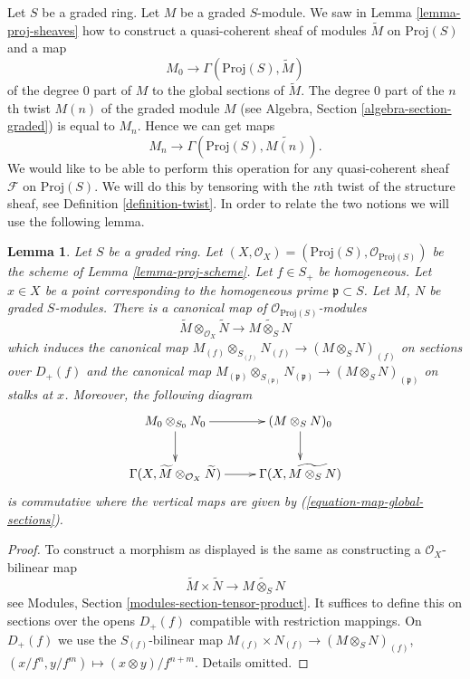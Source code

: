 \documentclass{stacks-project}
\theoremstyle{plain}
\newtheorem{lemma}[subsection]{Lemma}
\theoremstyle{definition}
\theoremstyle{remark}
\numberwithin{equation}{subsection}
\begin{document}
\noindent
Let $S$ be a graded ring. Let $M$ be a graded $S$-module.
We saw in Lemma \ref{lemma-proj-sheaves} how to construct a quasi-coherent
sheaf of modules $\widetilde{M}$ on $\text{Proj}(S)$ and a map
\begin{equation}
\label{equation-map-global-sections}
M_0 \longrightarrow \Gamma(\text{Proj}(S), \widetilde{M})
\end{equation}
of the degree $0$ part of $M$ to the global sections of $\widetilde{M}$.
The degree $0$ part of the $n$th twist $M(n)$ of the graded module $M$ (see
Algebra, Section \ref{algebra-section-graded})
is equal to $M_n$. Hence we can get maps
\begin{equation}
\label{equation-map-global-sections-degree-n}
M_n \longrightarrow \Gamma(\text{Proj}(S), \widetilde{M(n)}).
\end{equation}
We would like to be able to perform this operation for any quasi-coherent
sheaf $\mathcal{F}$ on $\text{Proj}(S)$. We will do this by tensoring
with the $n$th twist of the structure sheaf, see
Definition \ref{definition-twist}. In order to relate the two notions
we will use the following lemma.

\begin{lemma}
\label{lemma-widetilde-tensor}
Let $S$ be a graded ring.
Let $(X, \mathcal{O}_X) = (\text{Proj}(S), \mathcal{O}_{\text{Proj}(S)})$
be the scheme of Lemma \ref{lemma-proj-scheme}.
Let $f \in S_{+}$ be homogeneous. Let $x \in X$ be a point
corresponding to the homogeneous prime $\mathfrak p \subset S$.
Let $M$, $N$ be graded $S$-modules.
There is a canonical map of $\mathcal{O}_{\text{Proj}(S)}$-modules
$$
\widetilde M \otimes_{\mathcal{O}_X} \widetilde N
\longrightarrow
\widetilde{M \otimes_S N}
$$
which induces the canonical map
$
M_{(f)} \otimes_{S_{(f)}} N_{(f)}
\to
(M \otimes_S N)_{(f)}
$
on sections over $D_{+}(f)$ and the canonical map
$
M_{(\mathfrak p)} \otimes_{S_{(\mathfrak p)}} N_{(\mathfrak p)}
\to
(M \otimes_S N)_{(\mathfrak p)}
$
on stalks at $x$. Moreover, the following diagram
$$
\xymatrix{
M_0 \otimes_{S_0} N_0 \ar[r] \ar[d] &
(M \otimes_S N)_0 \ar[d] \\
\Gamma(X, \widetilde M \otimes_{\mathcal{O}_X} \widetilde N) \ar[r] &
\Gamma(X, \widetilde{M \otimes_S N})
}
$$
is commutative where the vertical maps are given by
(\ref{equation-map-global-sections}).
\end{lemma}

\begin{proof}
To construct a morphism as displayed is the same as constructing
a $\mathcal{O}_X$-bilinear map
$$
\widetilde M \times \widetilde N
\longrightarrow
\widetilde{M \otimes_S N}
$$
see Modules, Section \ref{modules-section-tensor-product}.
It suffices to define this on sections over the opens $D_{+}(f)$
compatible with restriction mappings. On $D_{+}(f)$ we use the
$S_{(f)}$-bilinear map
$M_{(f)} \times N_{(f)} \to (M \otimes_S N)_{(f)}$,
$(x/f^n, y/f^m) \mapsto (x \otimes y)/f^{n + m}$. Details omitted.
\end{proof}
\end{document}
